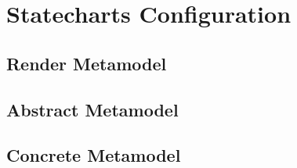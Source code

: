\section{Statecharts Configuration}
\label{app:state}
\subsection*{Render Metamodel}

\subsection*{Abstract Metamodel}

\subsection*{Concrete Metamodel}
